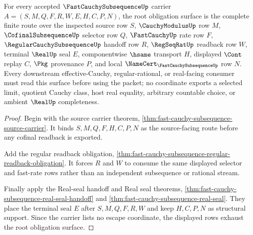 \begin{theorem}
\label{thm:fast-cauchy-subsequence-root-obligation}
For every accepted $\FastCauchySubsequenceUp$ carrier $A=(S,M,Q,F,R,W,E,H,C,P,N)$, the root obligation surface is the complete finite route over the inspected source row $S$, $\CauchyModulusUp$ row $M$, $\CofinalSubsequenceUp$ selector row $Q$, $\FastCauchyUp$ rate row $F$, $\RegularCauchySubsequenceUp$ handoff row $R$, $\RegSeqRatUp$ readback row $W$, terminal $\RealUp$ seal $E$, componentwise $\hsame$ transport $H$, displayed $\Cont$ replay $C$, $\Pkg$ provenance $P$, and local $\NameCert_{\FastCauchySubsequenceUp}$ row $N$. Every downstream effective-Cauchy, regular-rational, or real-facing consumer must read this surface before using the packet; no coordinate exports a selected limit, quotient Cauchy class, host real equality, arbitrary countable choice, or ambient $\RealUp$ completeness.
\end{theorem}
\begin{proof}
Begin with the source carrier theorem, \autoref{thm:fast-cauchy-subsequence-source-carrier}. It binds $S,M,Q,F,H,C,P,N$ as the source-facing route before any cofinal readback is exported.

Add the regular readback obligation, \autoref{thm:fast-cauchy-subsequence-regular-readback-obligation}. It forces $R$ and $W$ to consume the same displayed selector and fast-rate rows rather than an independent subsequence or rational stream.

Finally apply the Real-seal handoff and Real seal theorems, \autoref{thm:fast-cauchy-subsequence-real-seal-handoff} and \autoref{thm:fast-cauchy-subsequence-real-seal}. They place the terminal seal $E$ after $S,M,Q,F,R,W$ and keep $H,C,P,N$ as structural support. Since the carrier lists no escape coordinate, the displayed rows exhaust the root obligation surface.
\end{proof}

